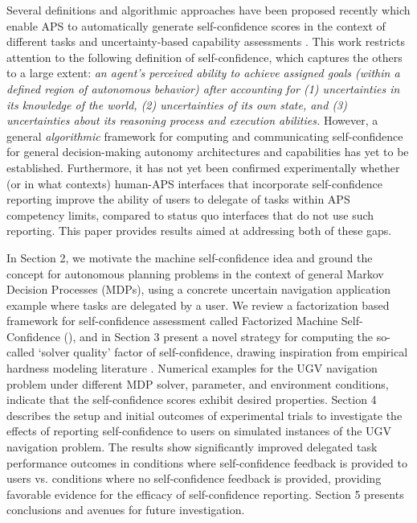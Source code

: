 Several definitions and algorithmic approaches have been proposed recently which enable APS to automatically generate self-confidence scores in the context of different tasks and uncertainty-based capability assessments \cite{Sweet2016-tz, Israelsen2019-to}. This work restricts attention to the following definition of self-confidence, which captures the others to a large extent: \textit{an agent's perceived ability to achieve assigned goals (within a defined region of autonomous behavior) after accounting for (1) uncertainties in its knowledge of the world, (2) uncertainties of its own state, and (3) uncertainties about its reasoning process and execution abilities.} However, a general \emph{algorithmic} framework for computing and communicating self-confidence for general decision-making autonomy architectures and capabilities has yet to be established. Furthermore, it has not yet been confirmed experimentally whether (or in what contexts) human-APS interfaces that incorporate self-confidence reporting improve the ability of users to delegate of tasks within APS competency limits, compared to status quo interfaces that do not use such reporting. This paper provides results aimed at addressing both of these gaps. 


In Section 2, we motivate the machine self-confidence idea and ground the concept for autonomous planning problems in the context of general Markov Decision Processes (MDPs), using a concrete uncertain navigation application example where tasks are delegated by a user. We review a factorization based framework for self-confidence assessment called Factorized Machine Self-Confidence (\famsec), and in Section 3 present a novel strategy for computing the so-called `solver quality' factor of self-confidence, drawing inspiration from empirical hardness modeling literature \cite{Leyton-Brown2009-yr}. Numerical examples for the UGV navigation problem under different MDP solver, parameter, and environment conditions, indicate that the self-confidence scores exhibit desired properties. Section 4 describes the setup and initial outcomes of experimental trials to investigate the effects of reporting self-confidence to users on simulated instances of the UGV navigation problem. The results show significantly improved delegated task performance outcomes in conditions where self-confidence feedback is provided to users vs. conditions where no self-confidence feedback is provided, providing favorable evidence for the efficacy of self-confidence reporting. Section 5 presents conclusions and avenues for future investigation. %


